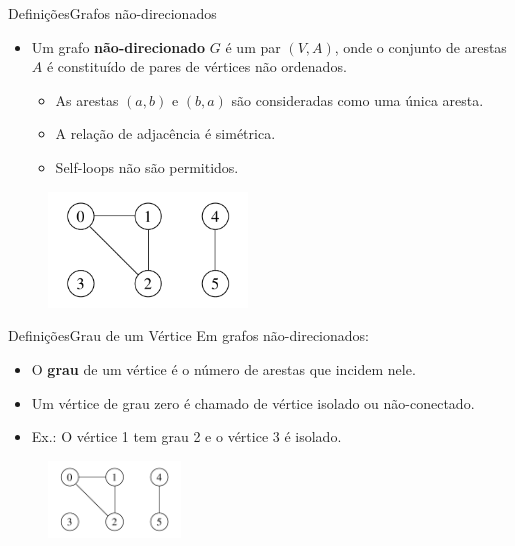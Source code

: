 \documentclass[aspectratio=169]{beamer}
\begin{document}
\begin{frame}{Definições}{Grafos não-direcionados}
\begin{itemize}
\item  Um grafo {\bf não-direcionado} $G$ é um par $(V, A)$, onde o conjunto de arestas $A$ é constituído de pares de vértices não ordenados.
\begin{itemize}
\item As arestas $(a, b)$ e $(b, a)$ são consideradas como uma única aresta.
\item A relação de adjacência é simétrica.
\item Self-loops não são permitidos.
\end{itemize}
\end{itemize}
\begin{figure}[!h]
  \centering
  \includegraphics[width=150pt]{imagens/exemplo_grafo_nao_direcionado.png}
  \label{fig_exemplo_grafo_nao_direcionado}
\end{figure}
\end{frame}


\begin{frame}{Definições}{Grau de um Vértice}
Em grafos não-direcionados:
\begin{itemize}
\item O {\bf grau} de um vértice é o número de arestas que incidem nele.
\item Um vértice de grau zero é chamado de vértice isolado ou não-conectado.
\item Ex.: O vértice 1 tem grau 2 e o vértice 3 é isolado.
\end{itemize}

\begin{figure}[!h]
  \centering
  \includegraphics[width=100pt]{imagens/exemplo_grafo_nao_direcionado.png}
  \label{fig_exemplo_grau_grafo_nao_direcionado}
\end{figure}

\end{frame}
\end{document}
